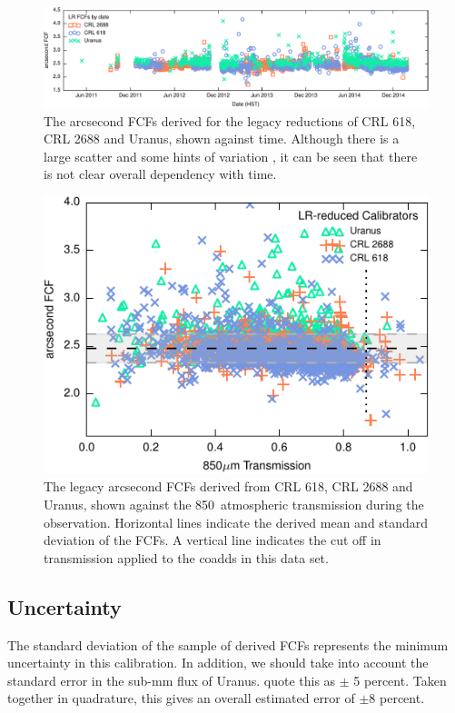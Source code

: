 \documentclass[twocolumn]{aastex6}
\begin{document}
\begin{figure}
\includegraphics{legacyFCF-vs-date.pdf}
\caption{The arcsecond FCFs derived for the legacy reductions of CRL
  618, CRL 2688 and Uranus, shown against time. Although there is a
  large scatter and some hints of variation , it can be seen that there is not
  clear overall dependency with time.\label{fig:calibvstime}}
\end{figure}
\begin{figure}
\includegraphics{legacyFCF-vs-transmission.pdf}
\caption{The legacy arcsecond FCFs derived from CRL 618, CRL 2688 and
  Uranus, shown against the 850\micron\ atmospheric transmission
  during the observation. Horizontal lines indicate the derived mean
  and standard deviation of the FCFs. A vertical line indicates the
  cut off in transmission applied to the coadds in this data
  set. \label{fig:calibvstrans}}
\end{figure}


\subsection{Uncertainty}

The standard deviation of the sample of derived FCFs represents the
minimum uncertainty in this calibration. In addition, we should take
into account the standard error in the sub-mm flux of
Uranus. \citet{Dempsey2013} quote this as $\pm$ 5 percent. Taken
together in quadrature, this gives an overall estimated error of
$\pm$8 percent.
\end{document}
